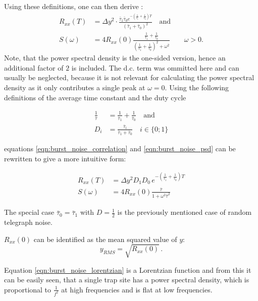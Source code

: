 Using these definitions, one can then derive \cite{burst_noise_wiener_khinchin}:
\begin{align}
    R_{xx} (T) &= \Delta y^2 \cdot \frac{\bar \tau_1 \bar \tau_0 e^{-\left(\frac{1}{\bar \tau_1}+\frac{1}{\bar \tau_0}\right)T}}{\left(\bar \tau_1 + \bar \tau_0\right)^2} \quad \text{and} \label{eqn:burst_noise_correlation}\\
    S(\omega) &= 4 R_{xx}(0) \frac{\frac{1}{\bar \tau_1} + \frac{1}{\bar \tau_0}}{\left(\frac{1}{\bar \tau_1} + \frac{1}{\bar \tau_0}\right)^2 + \omega^2} \qquad \omega > 0 . \label{eqn:burst_noise_psd}
\end{align}
Note, that the power spectral density is the one-sided version, hence an additional factor of $2$ is included. The d.c. term was ommitted here and can usually be neglected, because it is not relevant for calculating the power spectral density as it only contributes a single peak at $\omega=0$. Using the following definitions of the average time constant and the duty cycle

\begin{align}
    \frac{1}{\bar \tau} &= \frac{1}{\bar \tau_1} + \frac{1}{\bar \tau_0} \quad \mathrm{and} \label{eqn:definition_bar_tau}\\
    D_i &= \frac{\bar \tau_i}{\bar \tau_1 + \bar \tau_0} \quad i \in \{0 ; 1\}
\end{align}

equations \ref{eqn:burst_noise_correlation} and \ref{eqn:burst_noise_psd} can be rewritten to give a more intuitive form:

\begin{align}
    R_{xx} (T) &= \Delta y^2 D_1 D_0 \, e^{-\left(\frac{1}{\bar \tau_1}+\frac{1}{\bar \tau_0}\right)T}\\
    S(\omega) &= 4 R_{xx}(0) \frac{\bar \tau}{1 + \omega^2 \bar \tau^2} \label{eqn:burst_noise_lorentzian}
\end{align}

The special case $\bar \tau_0 = \bar \tau_1$ with $D=\frac 1 2$ is the previously mentioned case of random telegraph noise.

$R_{xx} (0)$ can be identified as the mean squared value of $y$:
\begin{equation}
    y_{RMS} = \sqrt{R_{xx}(0)} \,.
\end{equation}

Equation \ref{eqn:burst_noise_lorentzian} is a Lorentzian function and from this it can be easily seen, that a single trap site has a power spectral density, which is proportional to $\frac{1}{f^2}$ at high frequencies and is flat at low frequencies.

